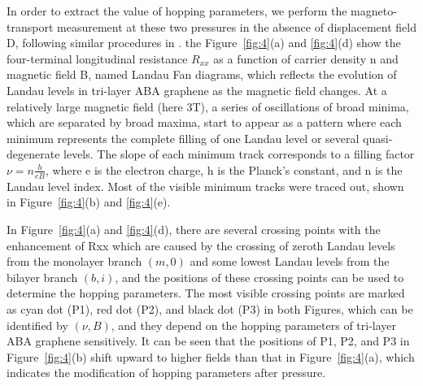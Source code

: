 In order to extract the value of hopping parameters, we perform the magneto-transport measurement at these two pressures in the absence of displacement field D, following similar procedures in \cite{taychatanapat2011quantum, campos2016landau}.
the Figure~\ref{fig:4}(a) and \ref{fig:4}(d) show the four-terminal longitudinal resistance $R_{xx}$ as a function of carrier density n and magnetic field B, named Landau Fan diagrams, 
which reflects the evolution of Landau levels in tri-layer ABA graphene as the magnetic field changes.
At a relatively large magnetic field (here 3T), a series of oscillations of broad minima, which are separated by broad maxima, 
start to appear as a pattern where each minimum represents the complete filling of one Landau level or several quasi-degenerate levels. 
The slope of each minimum track corresponds to a filling factor $\nu=n\frac{h}{eB}$, where e is the electron charge, h is the Planck's constant, and n is the Landau level index. 
Most of the visible minimum tracks were traced out, shown in Figure~\ref{fig:4}(b) and \ref{fig:4}(e).

In Figure~\ref{fig:4}(a) and \ref{fig:4}(d), there are several crossing points with the enhancement of Rxx which are caused by the crossing of zeroth Landau levels 
from the monolayer branch $(m, 0)$ and some lowest Landau levels from the bilayer branch $(b, i)$, 
and the positions of these crossing points can be used to determine the hopping parameters. 
The most visible crossing points are marked as cyan dot (P1), red dot (P2), and black dot (P3) in both Figures,
which can be identified by $(\nu, B)$, and they depend on the hopping parameters of tri-layer ABA graphene sensitively. 
It can be seen that the positions of P1, P2, and P3 in Figure~\ref{fig:4}(b) shift upward to higher fields than that in Figure~\ref{fig:4}(a), 
which indicates the modification of hopping parameters after pressure.

